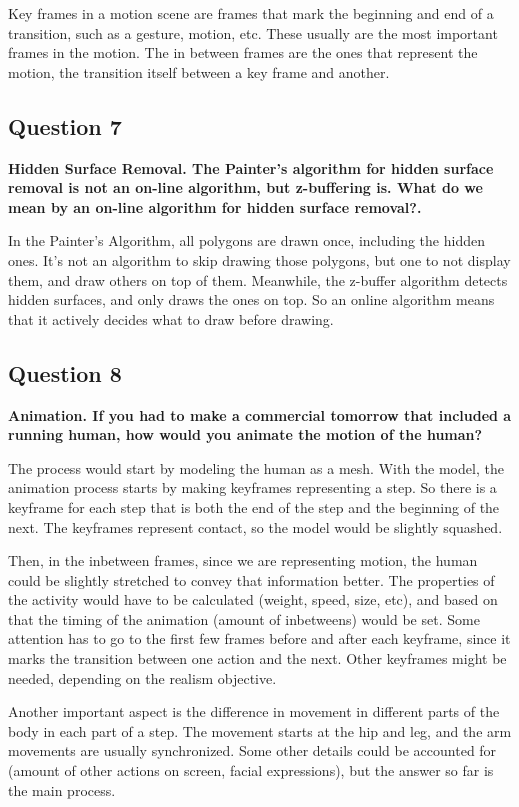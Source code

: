 \documentclass[12pt]{article}
\begin{document}
Key frames in a motion scene are frames that mark the beginning and end of a transition, such as a gesture, motion, etc. These usually are the most important frames in the motion. The in between frames are the ones that represent the motion, the transition itself between a key frame and another.

\subsection*{Question 7}
{\bfseries Hidden Surface Removal. The Painter’s algorithm for hidden surface removal is not an on-line algorithm, but z-buffering is. What do we mean by an on-line algorithm for hidden surface removal?.}

In the Painter's Algorithm, all polygons are drawn once, including the hidden ones. It's not an algorithm to skip drawing those polygons, but one to not display them, and draw others on top of them. Meanwhile, the z-buffer algorithm detects hidden surfaces, and only draws the ones on top. So an online algorithm means that it actively decides what to draw before drawing.

\subsection*{Question 8}
{\bfseries Animation. If you had to make a commercial tomorrow that included a running human, how would you animate the motion of the human?}

The process would start by modeling the human as a mesh. With the model, the animation process starts by making keyframes representing a step. So there is a keyframe for each step that is both the end of the step and the beginning of the next. The keyframes represent contact, so the model would be slightly squashed.

Then, in the inbetween frames, since we are representing motion, the human could be slightly stretched to convey that information better. The properties of the activity would have to be calculated (weight, speed, size, etc), and based on that the timing of the animation (amount of inbetweens) would be set. Some attention has to go to the first few frames before and after each keyframe, since it marks the transition between one action and the next. Other keyframes might be needed, depending on the realism objective.

Another important aspect is the difference in movement in different parts of the body in each part of a step. The movement starts at the hip and leg, and the arm movements are usually synchronized. Some other details could be accounted for (amount of other actions on screen, facial expressions), but the answer so far is the main process.
\end{document}
